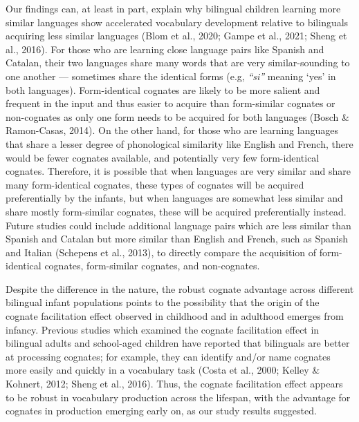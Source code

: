 \documentclass[
  english,
  ,man,floatsintext]{apa6}
\begin{document}
Our findings can, at least in part, explain why bilingual children learning more similar languages show accelerated vocabulary development relative to bilinguals acquiring less similar languages (Blom et al., 2020; Gampe et al., 2021; Sheng et al., 2016). For those who are learning close language pairs like Spanish and Catalan, their two languages share many words that are very similar-sounding to one another --- sometimes share the identical forms (e.g, \emph{``si''} meaning `yes' in both languages). Form-identical cognates are likely to be more salient and frequent in the input and thus easier to acquire than form-similar cognates or non-cognates as only one form needs to be acquired for both languages (Bosch \& Ramon-Casas, 2014). On the other hand, for those who are learning languages that share a lesser degree of phonological similarity like English and French, there would be fewer cognates available, and potentially very few form-identical cognates. Therefore, it is possible that when languages are very similar and share many form-identical cognates, these types of cognates will be acquired preferentially by the infants, but when languages are somewhat less similar and share mostly form-similar cognates, these will be acquired preferentially instead. Future studies could include additional language pairs which are less similar than Spanish and Catalan but more similar than English and French, such as Spanish and Italian (Schepens et al., 2013), to directly compare the acquisition of form-identical cognates, form-similar cognates, and non-cognates.

Despite the difference in the nature, the robust cognate advantage across different bilingual infant populations points to the possibility that the origin of the cognate facilitation effect observed in childhood and in adulthood emerges from infancy. Previous studies which examined the cognate facilitation effect in bilingual adults and school-aged children have reported that bilinguals are better at processing cognates; for example, they can identify and/or name cognates more easily and quickly in a vocabulary task (Costa et al., 2000; Kelley \& Kohnert, 2012; Sheng et al., 2016). Thus, the cognate facilitation effect appears to be robust in vocabulary production across the lifespan, with the advantage for cognates in production emerging early on, as our study results suggested.
\end{document}
